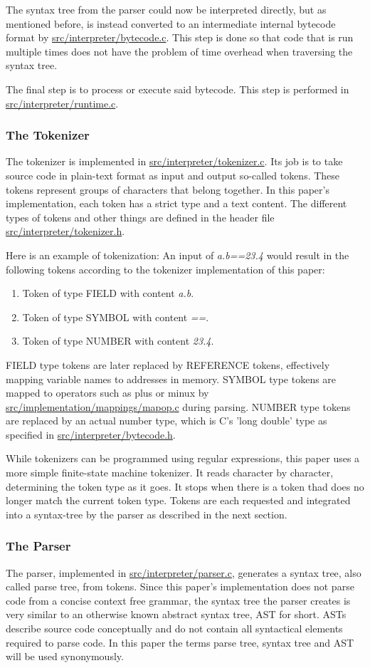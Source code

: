 \documentclass[12pt,a4paper]{article}
\newcommand{\hrc}[1]{\hyperref[#1]{#1}}
\begin{document}
The syntax tree from the parser could now be interpreted directly, but as mentioned 
before, is instead converted
to an intermediate internal bytecode format by \hrc{src/interpreter/bytecode.c}.
This step is done so that code that is run multiple times does not have
the problem of time overhead when traversing the syntax tree.

The final step is to process or execute said bytecode. This step is performed
in \hrc{src/interpreter/runtime.c}.

\subsubsection{The Tokenizer}
The tokenizer is implemented in \hrc{src/interpreter/tokenizer.c}. Its job is to
take source code in plain-text format as input and output so-called tokens.
These tokens represent groups of characters that belong together. In this paper's
implementation, each token has a strict type and a text content.
The different types of tokens and other things are defined in the header file
\hrc{src/interpreter/tokenizer.h}.

Here is an example of tokenization:
An input of \emph{a.b==23.4} would result in the following tokens according
to the tokenizer implementation of this paper:
\begin{enumerate}
    \item Token of type FIELD with content \emph{a.b}.
    \item Token of type SYMBOL with content \emph{==}.
    \item Token of type NUMBER with content \emph{23.4}.
\end{enumerate}
FIELD type tokens are later replaced by REFERENCE tokens, effectively mapping
variable names to addresses in memory.
SYMBOL type tokens are mapped to operators such as plus or minux by \hrc{src/implementation/mappings/mapop.c}
during parsing. NUMBER type tokens are replaced by an actual number type, which
is C's 'long double' type as specified in \hrc{src/interpreter/bytecode.h}.

While tokenizers can be programmed using regular expressions, 
this paper uses a more simple finite-state machine tokenizer.
It reads character by character, determining the token type as it goes.
It stops when there is a token thad does no longer match the current token type.
Tokens are each requested and integrated into a syntax-tree by the parser as described in the next
section.

\subsubsection{The Parser}
The parser, implemented in \hrc{src/interpreter/parser.c}, generates a syntax tree,
also called parse tree, from tokens. Since this paper's implementation 
does not parse code from a
concise context free grammar, the syntax tree the parser creates is very
similar to an otherwise known abstract syntax tree, AST for short.
ASTs describe source code conceptually and do not contain all syntactical
elements required to parse code.
In this paper the terms parse tree, syntax tree and AST will be used
synonymously.
\end{document}
